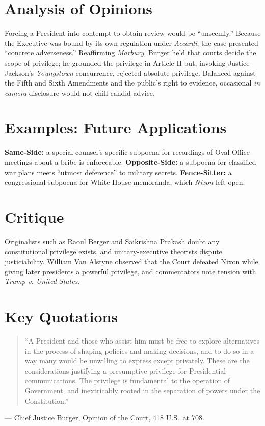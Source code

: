 \documentclass[12pt]{article}
\begin{document}
\section{Analysis of Opinions}
Forcing a President into contempt to obtain review would be ``unseemly.'' Because the Executive was bound by its own regulation under \textit{Accardi}, the case presented ``concrete adverseness.'' Reaffirming \textit{Marbury}, Burger held that courts decide the scope of privilege; he grounded the privilege in Article II but, invoking Justice Jackson's \textit{Youngstown} concurrence, rejected absolute privilege. Balanced against the Fifth and Sixth Amendments and the public's right to evidence, occasional \textit{in camera} disclosure would not chill candid advice.

\section{Examples: Future Applications}
\textbf{Same-Side:} a special counsel's specific subpoena for recordings of Oval Office meetings about a bribe is enforceable. \textbf{Opposite-Side:} a subpoena for classified war plans meets ``utmost deference'' to military secrets. \textbf{Fence-Sitter:} a congressional subpoena for White House memoranda, which \textit{Nixon} left open.

\section{Critique}
Originalists such as Raoul Berger and Saikrishna Prakash doubt any constitutional privilege exists, and unitary-executive theorists dispute justiciability. William Van Alstyne observed that the Court defeated Nixon while giving later presidents a powerful privilege, and commentators note tension with \textit{Trump v. United States}.

\section{Key Quotations}
\begin{quote}
``A President and those who assist him must be free to explore alternatives in the process of shaping policies and making decisions, and to do so in a way many would be unwilling to express except privately. These are the considerations justifying a presumptive privilege for Presidential communications. The privilege is fundamental to the operation of Government, and inextricably rooted in the separation of powers under the Constitution.''
\end{quote}
\noindent --- Chief Justice Burger, Opinion of the Court, 418 U.S.\ at 708.
\end{document}

